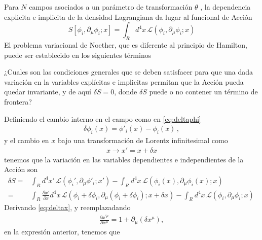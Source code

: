 Para $N$ campos asociados a un parámetro de transformación $\theta$ , la dependencia explicita e implicita de la densidad Lagrangiana da lugar al funcional de Acción
\begin{equation}
  S[\phi_i,\partial_\mu\phi_i;x]=\int_{R}d^4x\,\mathcal{L}(\phi_i,\partial_\mu\phi_i;x)
\end{equation}
El problema variacional de Noether, que es diferente al principio de Hamilton, puede ser establecido en los siguientes términos

¿Cuales son las condiciones generales que se deben satisfacer para que una dada variación en la variables explícitas e implicitas permitan que la Acción pueda quedar invariante, y de aquí $\delta S=0$, donde $\delta S$ puede o no contener un término de frontera?

Definiendo el cambio interno en el campo como en \eqref{eq:deltaphi}
\begin{align}
  \delta\phi_i(x)=\phi'_i(x)-\phi_i(x)\,,
\end{align}
y el cambio en $x$ bajo una transformación de Lorentz infinitesimal como
\begin{align}
\label{eq:deltax}
  x\to x'=x+\delta x
\end{align}
tenemos que la variación en las variables dependientes e independientes de la Acción son
\begin{align}
   \delta S=&\int_{R}d^4x'\,\mathcal{L} \left( \phi_{i}',\partial_{\mu}\phi'_i;x' \right)- \int_{R}d^4x\,\mathcal{L} \left( \phi_{i}(x),\partial_{\mu}\phi_i(x);x \right) \nonumber\\
     =&\int_{R}\frac{\partial x'}{\partial x}d^4x\,\mathcal{L} \left( \phi_{i}+\delta\phi_i,\partial_{\mu}(\phi_i+\delta\phi_i);x+\delta x \right)- \int_{R}d^4x\,\mathcal{L} \left( \phi_{i},\partial_{\mu}\phi_i;x \right)\,
\end{align}
Derivando \eqref{eq:deltax}, y reemplazadando
\begin{align}
  \frac{\partial x^{\prime \mu}}{\partial x^{\mu}}=1+\partial_{\mu} \left( \delta x^{\mu} \right),
\end{align}
en la expresión anterior, tenemos que
